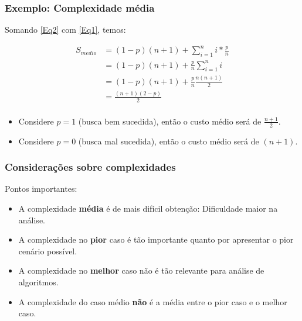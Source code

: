 \documentclass[10pt]{beamer}
\begin{document}
\begin{frame}
    \frametitle{Exemplo: Complexidade média}
    Somando \ref{Eq2} com \ref{Eq1}, temos:

    \begin{align*}
        S_{medio} & = (1-p) (n+1) + \sum_{i=1}^n i*\frac{p}{n}  \\
                  & = (1-p)(n+1) + \frac{p}{n} \sum_{i=1}^n i   \\
                  & = (1-p)(n+1) + \frac{p}{n} \frac{n(n+1)}{2} \\
                  & = \frac{(n+1)(2-p)}{2}                      \\
    \end{align*}

    \begin{itemize}
        \item Considere $p=1$ (busca bem sucedida), então o custo médio será de $\frac{n+1}{2}$.
        \item Considere $p=0$ (busca mal sucedida), então o custo médio será de $(n+1)$.
    \end{itemize}
\end{frame}


\begin{frame}
    \frametitle{Considerações sobre complexidades}

    Pontos importantes:

    \begin{itemize}
        \item A complexidade \textbf{média} é de mais difícil obtenção: Dificuldade maior na análise.
        \item A complexidade no \textbf{pior} caso é tão importante quanto por apresentar o pior cenário possível.
        \item A complexidade no \textbf{melhor} caso não é tão relevante para análise de algoritmos.
        \item A complexidade do caso médio \textbf{não} é a média entre o pior caso e o melhor caso.

    \end{itemize}
\end{frame}
\end{document}
